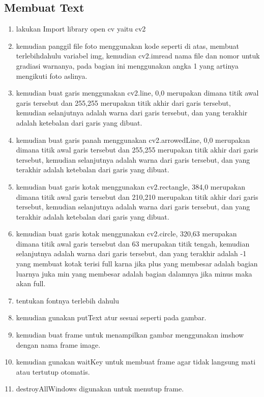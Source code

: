 \subsection{Membuat Text}

\begin{enumerate}
	\item lakukan Import library open cv yaitu cv2
	\item kemudian panggil file foto menggunakan kode seperti di atas, membuat terlebihdahulu variabel img, kemudian cv2.imread nama file dan nomor untuk gradiasi warnanya, pada bagian ini menggunakan angka 1 yang artinya mengikuti foto aslinya.
	\item kemudian buat garis menggunakan cv2.line, 0,0 merupakan dimana titik awal garis tersebut dan 255,255 merupakan titik akhir dari garis tersebut, kemudian selanjutnya adalah warna dari garis tersebut, dan yang terakhir adalah ketebalan dari garis yang dibuat.
	\item kemudian buat garis panah menggunakan cv2.arrowedLine, 0,0 merupakan dimana titik awal garis tersebut dan 255,255 merupakan titik akhir dari garis tersebut, kemudian selanjutnya adalah warna dari garis tersebut, dan yang terakhir adalah ketebalan dari garis yang dibuat.
	\item kemudian buat garis kotak menggunakan cv2.rectangle, 384,0 merupakan dimana titik awal garis tersebut dan 210,210 merupakan titik akhir dari garis tersebut, kemudian selanjutnya adalah warna dari garis tersebut, dan yang terakhir adalah ketebalan dari garis yang dibuat.
	\item kemudian buat garis kotak menggunakan cv2.circle, 320,63 merupakan dimana titik awal garis tersebut dan 63 merupakan titik tengah, kemudian selanjutnya adalah warna dari garis tersebut, dan yang terakhir adalah -1 yang membuat kotak terisi full karna jika plus yang membesar adalah bagian luarnya juka min yang membesar adalah bagian dalamnya jika minus maka akan full.
	\item tentukan fontnya terlebih dahulu
	\item kemudian gunakan putText atur sesuai seperti pada gambar.
	\item kemudian buat frame untuk menampilkan gambar menggunakan imshow dengan nama frame image.
	\item kemudian gunakan waitKey untuk membuat frame agar tidak langsung mati atau tertutup otomatis.
	\item destroyAllWindows digunakan untuk menutup frame.
\end{enumerate}

